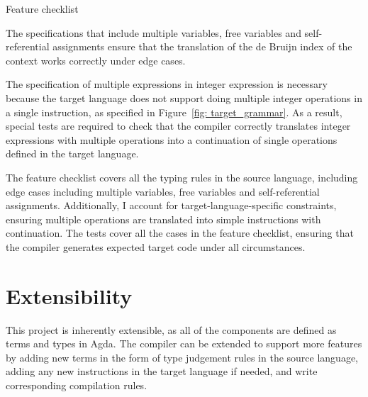 \documentclass[12pt,a4paper]{report}
\theoremstyle{definition}
\begin{document}
\begin{table}[H]
        \caption{Feature checklist}
        \label{tab: feature_checklist}
    \end{table}

    The specifications that include multiple variables, free variables and self-referential assignments ensure that the translation of the de Bruijn index of the context works correctly under edge cases.

    The specification of multiple expressions in integer expression is necessary because the target language does not support doing multiple integer operations in a single instruction, as specified in Figure~\ref{fig: target_grammar}. As a result, special tests are required to check that the compiler correctly translates integer expressions with multiple operations into a continuation of single operations defined in the target language. 

    The feature checklist covers all the typing rules in the source language, including edge cases including multiple variables, free variables and self-referential assignments. Additionally, I account for target-language-specific constraints, ensuring multiple operations are translated into simple instructions with continuation. The tests cover all the cases in the feature checklist, ensuring that the compiler generates expected target code under all circumstances.

    \section{Extensibility}
    This project is inherently extensible, as all of the components are defined as terms and types in Agda. The compiler can be extended to support more features by adding new terms in the form of type judgement rules in the source language, adding any new instructions in the target language if needed, and write corresponding compilation rules.
\end{document}
